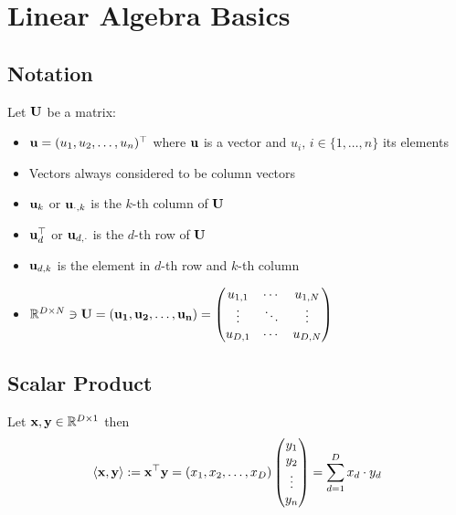 \chapter{Linear Algebra Basics}
\section{Notation}
Let \(\mathbf{U}\) be a matrix:
\begin{itemize}
\item \(\mathbf{u} = (u_1, u_2, \ldots, u_n)^\top\) where \(\mathbf{u}\) is a vector and \(u_i,\, i \in \{1, \ldots, n\}\) its elements
\item Vectors always considered to be column vectors
\item \(\mathbf{u}_k\) or \(\mathbf{u}_{\cdot, k}\) is the \(k\)-th column of \(\mathbf{U}\)
\item \(\mathbf{u}^\top_d\) or \(\mathbf{u}_{d, \cdot}\) is the \(d\)-th row of \(\mathbf{U}\)
\item \(\mathbf{u}_{d, k}\) is the element in \(d\)-th row and \(k\)-th column
\item \(\mathbb{R}^{D \times N} \ni \mathbf{U} = (\mathbf{u_1}, \mathbf{u_2}, \ldots, \mathbf{u_n}) = \begin{pmatrix}
u_{1,1} & \cdots & u_{1, N} \\
\vdots & \ddots & \vdots \\
u_{D, 1} & \cdots & u_{D, N}
\end{pmatrix}\)
\end{itemize}

\section{Scalar Product}
Let \(\mathbf{x}, \mathbf{y} \in \mathbb{R}^{D \times 1}\) then \[ \langle \mathbf{x}, \mathbf{y} \rangle := \mathbf{x}^\top \mathbf{y} = (x_1, x_2, \ldots, x_D) \begin{pmatrix}
y_1 \\ y_2 \\ \vdots \\ y_n
\end{pmatrix} = \sum_{d=1}^D x_d \cdot y_d\]

